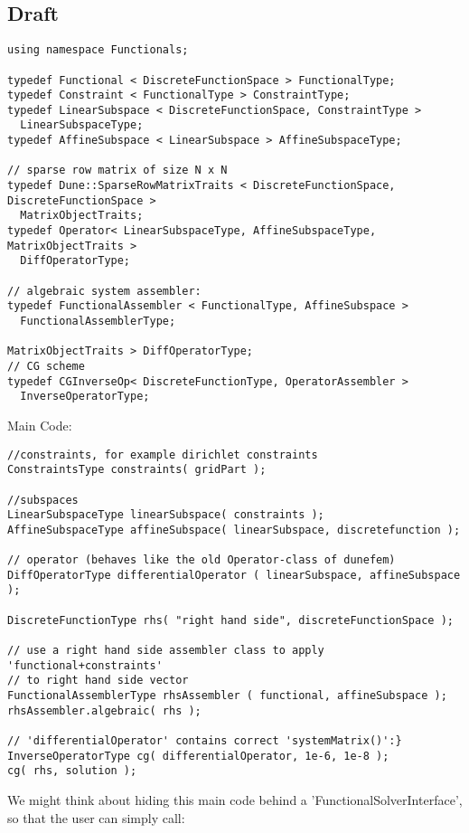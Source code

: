 \documentclass[a4paper,11pt]{article}
\numberwithin{equation}{section}
\begin{document}
\subsection{Draft}

\begin{lstlisting}
using namespace Functionals;

typedef Functional < DiscreteFunctionSpace > FunctionalType; 
typedef Constraint < FunctionalType > ConstraintType; 
typedef LinearSubspace < DiscreteFunctionSpace, ConstraintType > 
  LinearSubspaceType; 
typedef AffineSubspace < LinearSubspace > AffineSubspaceType; 

// sparse row matrix of size N x N
typedef Dune::SparseRowMatrixTraits < DiscreteFunctionSpace, DiscreteFunctionSpace > 
  MatrixObjectTraits; 
typedef Operator< LinearSubspaceType, AffineSubspaceType, MatrixObjectTraits >   
  DiffOperatorType;

// algebraic system assembler:
typedef FunctionalAssembler < FunctionalType, AffineSubspace > 
  FunctionalAssemblerType;

MatrixObjectTraits > DiffOperatorType; 
// CG scheme
typedef CGInverseOp< DiscreteFunctionType, OperatorAssembler > 
  InverseOperatorType;
\end{lstlisting}
Main Code:
\begin{lstlisting}
//constraints, for example dirichlet constraints
ConstraintsType constraints( gridPart );

//subspaces
LinearSubspaceType linearSubspace( constraints );
AffineSubspaceType affineSubspace( linearSubspace, discretefunction );

// operator (behaves like the old Operator-class of dunefem)
DiffOperatorType differentialOperator ( linearSubspace, affineSubspace );

DiscreteFunctionType rhs( "right hand side", discreteFunctionSpace ); 

// use a right hand side assembler class to apply 'functional+constraints' 
// to right hand side vector
FunctionalAssemblerType rhsAssembler ( functional, affineSubspace );
rhsAssembler.algebraic( rhs );

// 'differentialOperator' contains correct 'systemMatrix()':}
InverseOperatorType cg( differentialOperator, 1e-6, 1e-8 );
cg( rhs, solution );
\end{lstlisting}

We might think about hiding this main code behind a 'FunctionalSolverInterface', so that the user can simply call:
\end{document}
